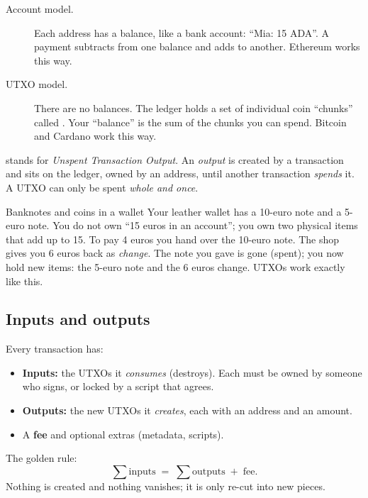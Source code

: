 \begin{description}
  \item[Account model.] Each address has a balance, like a bank account: ``Mia: 15 ADA''. A payment subtracts from one balance and adds to another. Ethereum works this way.
  \item[UTXO model.] There are no balances. The ledger holds a set of individual coin ``chunks'' called . Your ``balance'' is the sum of the chunks you can spend. Bitcoin and Cardano work this way.
\end{description}

 stands for \emph{Unspent Transaction Output}. An \emph{output} is created by a transaction and sits on the ledger, owned by an address, until another transaction \emph{spends} it. A UTXO can only be spent \emph{whole and once}.

\begin{analogybox}{Banknotes and coins in a wallet}
Your leather wallet has a 10-euro note and a 5-euro note. You do not own ``15 euros in an account''; you own two physical items that add up to 15. To pay 4 euros you hand over the 10-euro note. The shop gives you 6 euros back as \emph{change}. The note you gave is gone (spent); you now hold new items: the 5-euro note and the 6 euros change. UTXOs work exactly like this.
\end{analogybox}

\subsection{Inputs and outputs}
Every transaction has:
\begin{itemize}
  \item \textbf{Inputs:} the UTXOs it \emph{consumes} (destroys). Each must be owned by someone who signs, or locked by a script that agrees.
  \item \textbf{Outputs:} the new UTXOs it \emph{creates}, each with an address and an amount.
  \item A \textbf{fee} and optional extras (metadata, scripts).
\end{itemize}
The golden rule:
\[
\sum \text{inputs} \;=\; \sum \text{outputs} \;+\; \text{fee}.
\]
Nothing is created and nothing vanishes; it is only re-cut into new pieces.

